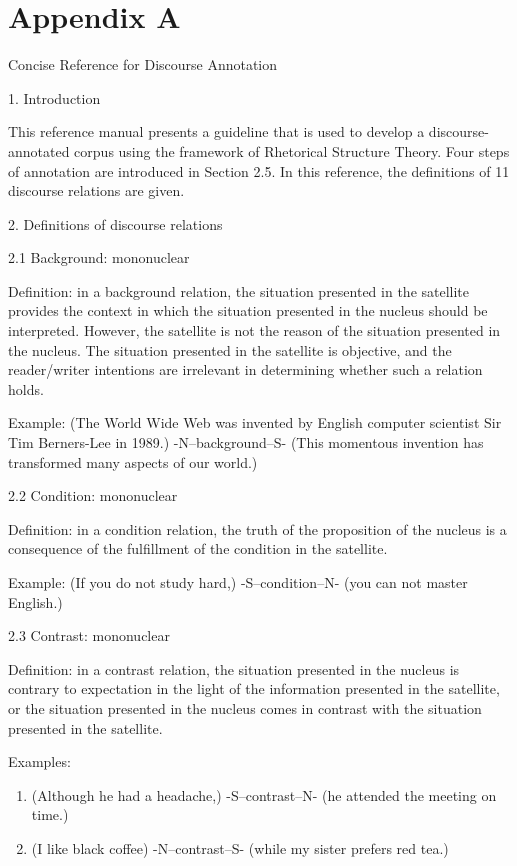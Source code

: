 \documentclass[english]{jnlp_1.3e}
\begin{document}
\section*{Appendix A}

\begin{center} \large{Concise Reference for Discourse Annotation}   \end{center}

1. Introduction

This reference manual presents a guideline that is used to 
develop a discourse-annotated corpus using the framework of 
Rhetorical Structure Theory. Four steps of annotation are introduced 
in Section 2.5. In this reference, the definitions of 11 discourse 
relations are given.

2. Definitions of discourse relations


2.1 Background: mononuclear

Definition: in a background relation, the situation presented in the satellite provides the context in which the situation presented in the nucleus should be interpreted. However, the satellite is not the reason of the situation presented in the nucleus. The situation presented in the satellite is objective, and the reader/writer intentions are irrelevant in determining whether such a relation holds. 

Example: (The World Wide Web was invented by English computer scientist Sir Tim Berners-Lee in 1989.) -N--background--S- (This momentous invention has transformed many aspects of our world.)


2.2 Condition: mononuclear

Definition: in a condition relation, the truth of the proposition of the nucleus is a consequence of the fulfillment of the condition in the satellite. 

Example: (If you do not study hard,) -S--condition--N- (you can not master English.)


2.3 Contrast: mononuclear

Definition: in a contrast relation, the situation presented in the nucleus is contrary to expectation in the light of the information presented in the satellite, or the situation presented in the nucleus comes in contrast with the situation presented in the satellite. 

Examples:

\begin{enumerate}
  \item (Although he had a headache,) -S--contrast--N- (he attended the meeting on time.)
  \item (I like black coffee) -N--contrast--S- (while my sister prefers red tea.)
\end{enumerate}
\end{document}
